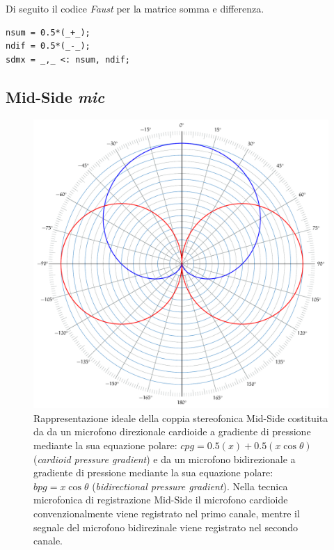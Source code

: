 Di seguito il codice \emph{Faust} per la matrice somma e differenza.

\begin{lstlisting}
nsum = 0.5*(_+_);
ndif = 0.5*(_-_);
sdmx = _,_ <: nsum, ndif;
\end{lstlisting}

\subsection{Mid-Side \emph{mic}}
\label{subsec:msmic}

\begin{figure}[b!]
\centering
\includegraphics[width=0.99\columnwidth]{CAPITOLI/_TIKZ/POLAR/midside}
\caption{Rappresentazione ideale della coppia stereofonica Mid-Side costituita da
da un microfono direzionale cardioide a gradiente di pressione mediante la sua
equazione polare: $cpg = 0.5(x) + 0.5(x\cos\theta)$ (\emph{cardioid pressure
gradient}) e da un microfono bidirezionale a gradiente di
pressione mediante la sua equazione polare: $bpg = x\cos\theta$
(\emph{bidirectional pressure gradient}). Nella tecnica microfonica di registrazione
Mid-Side il microfono cardioide convenzionalmente viene registrato nel primo canale,
mentre il segnale del microfono bidirezinale viene registrato nel secondo canale.}
\label{polar:midsidemic}
\end{figure}

